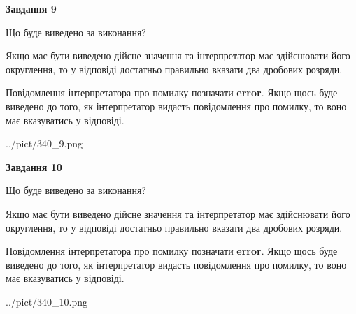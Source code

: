 \documentclass[12pt, ukrainian]{article}
\begin{document}
{\begin {Large}
{\begin {center}\textbf{Завдання 9}\end {center}}\par
Що буде виведено за виконання? \par

Якщо має бути виведено дійсне значення та інтерпретатор має здійснювати його округлення, 
то у відповіді достатньо правильно вказати два дробових розряди.

Повідомлення інтерпретатора про помилку позначати \textbf{error}.
Якщо щось буде виведено до того, як інтерпретатор видасть повідомлення про помилку, 
то воно має вказуватись у відповіді. \par

\begin{center}
	{../pict/340_9.png}
\end{center}
\newpage

{\begin {center}\textbf{Завдання 10}\end {center}}\par
Що буде виведено за виконання? \par

Якщо має бути виведено дійсне значення та інтерпретатор має здійснювати його округлення, 
то у відповіді достатньо правильно вказати два дробових розряди.

Повідомлення інтерпретатора про помилку позначати \textbf{error}.
Якщо щось буде виведено до того, як інтерпретатор видасть повідомлення про помилку, 
то воно має вказуватись у відповіді. \par

\begin{center}
	{../pict/340_10.png}
\end{center}
\newpage

\end {Large}}
\end{document}
